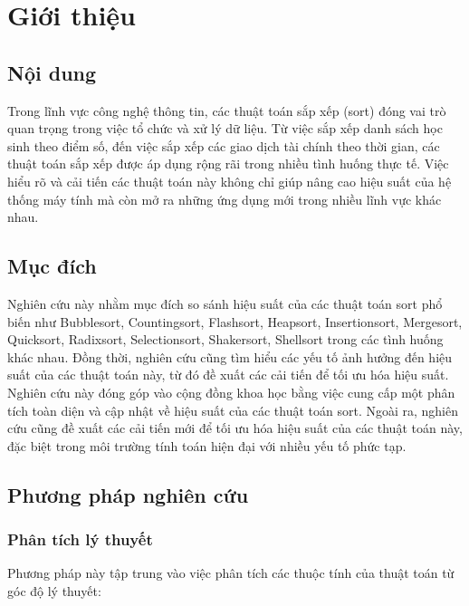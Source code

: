 \section{Giới thiệu}

\subsection{Nội dung}
Trong lĩnh vực công nghệ thông tin, các thuật toán sắp xếp (sort) đóng vai trò quan trọng trong việc tổ chức và xử lý dữ liệu. Từ việc sắp xếp danh sách học sinh theo điểm số, đến việc sắp xếp các giao dịch tài chính theo thời gian, các thuật toán sắp xếp được áp dụng rộng rãi trong nhiều tình huống thực tế. Việc hiểu rõ và cải tiến các thuật toán này không chỉ giúp nâng cao hiệu suất của hệ thống máy tính mà còn mở ra những ứng dụng mới trong nhiều lĩnh vực khác nhau.
\subsection{Mục đích}
Nghiên cứu này nhằm mục đích so sánh hiệu suất của các thuật toán sort phổ biến như Bubblesort, Countingsort, Flashsort, Heapsort, Insertionsort, Mergesort, Quicksort, Radixsort, Selectionsort, Shakersort, Shellsort trong các tình huống khác nhau. Đồng thời, nghiên cứu cũng tìm hiểu các yếu tố ảnh hưởng đến hiệu suất của các thuật toán này, từ đó đề xuất các cải tiến để tối ưu hóa hiệu suất.\\
Nghiên cứu này đóng góp vào cộng đồng khoa học bằng việc cung cấp một phân tích toàn diện và cập nhật về hiệu suất của các thuật toán sort. Ngoài ra, nghiên cứu cũng đề xuất các cải tiến mới để tối ưu hóa hiệu suất của các thuật toán này, đặc biệt trong môi trường tính toán hiện đại với nhiều yếu tố phức tạp.

\subsection{Phương pháp nghiên cứu}

\subsubsection{Phân tích lý thuyết}
Phương pháp này tập trung vào việc phân tích các thuộc tính của thuật toán từ góc độ lý thuyết:


